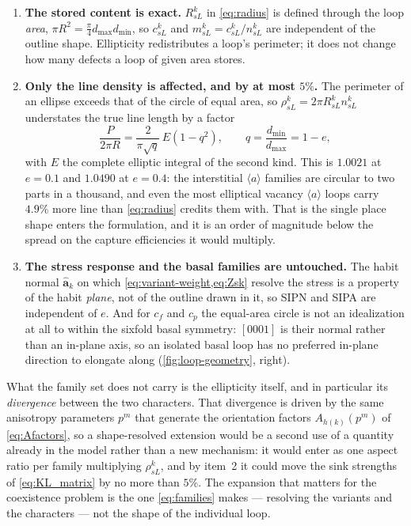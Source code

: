 \documentclass{article}
\newcommand{\aloop}{\ensuremath{\langle a\rangle}}
\begin{document}
\begin{enumerate}
\item \textbf{The stored content is exact.} $R^k_{sL}$ in \cref{eq:radius} is
      defined through the loop \emph{area}, $\pi R^2=\tfrac{\pi}{4}d_{\max}
      d_{\min}$, so $c^k_{sL}$ and $m^k_{sL}=c^k_{sL}/n^k_{sL}$ are independent
      of the outline shape. Ellipticity redistributes a loop's perimeter; it
      does not change how many defects a loop of given area stores.
\item \textbf{Only the line density is affected, and by at most $5\%$.} The
      perimeter of an ellipse exceeds that of the circle of equal area, so
      $\rho^k_{sL}=2\pi R^k_{sL}n^k_{sL}$ understates the true line length by a
      factor
      \begin{equation}
        \frac{P}{2\pi R}=\frac{2}{\pi\sqrt{q}}\,E\!\left(1-q^{2}\right),
        \qquad q=\frac{d_{\min}}{d_{\max}}=1-e,
        \label{eq:ellip-perimeter}
      \end{equation}
      with $E$ the complete elliptic integral of the second kind. This is
      $1.0021$ at $e=0.1$ and $1.0490$ at $e=0.4$: the interstitial \aloop{}
      families are circular to two parts in a thousand, and even the most
      elliptical vacancy \aloop{} loops carry $4.9\%$ more line than
      \cref{eq:radius} credits them with. That is the single place shape enters
      the formulation, and it is an order of magnitude below the spread on the
      capture efficiencies it would multiply.
\item \textbf{The stress response and the basal families are untouched.} The
      habit normal $\hat{\bm a}_k$ on which \cref{eq:variant-weight,eq:Zsk}
      resolve the stress is a property of the habit \emph{plane}, not of the
      outline drawn in it, so SIPN and SIPA are independent of $e$. And for
      $c_f$ and $c_p$ the equal-area circle is not an idealization at all to
      within the sixfold basal symmetry: $[0001]$ is their normal rather than an
      in-plane axis, so an isolated basal loop has no preferred in-plane
      direction to elongate along (\cref{fig:loop-geometry}, right).
\end{enumerate}

What the family set does not carry is the ellipticity itself, and in particular
its \emph{divergence} between the two characters. That divergence is driven by
the same anisotropy parameters $p^m$ that generate the orientation factors
$A_{h(k)}(p^m)$ of \cref{eq:Afactors}, so a shape-resolved extension would be a
second use of a quantity already in the model rather than a new mechanism: it
would enter as one aspect ratio per family multiplying $\rho^k_{sL}$, and by
item~2 it could move the sink strengths of \cref{eq:KL_matrix} by no more than
$5\%$. The expansion that matters for the coexistence problem is the one
\cref{eq:families} makes --- resolving the variants and the characters --- not
the shape of the individual loop.
\end{document}
